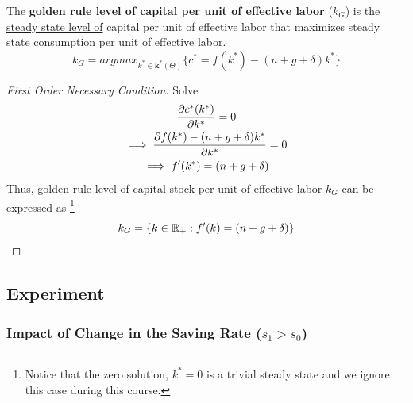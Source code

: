 \documentclass[]{article}
\begin{document}
		\begin{definition}
			The \textbf{golden rule level of capital per unit of effective labor} ($k_G$) is the \ul{steady state level of} capital per unit of effective labor that maximizes steady state consumption per unit of effective labor.
				\[
					k_G = argmax_{k^* \in \textbf{k}^*(\Theta)} \{c^* = f(k^*) - (n+g+ \delta) k^*\}
				\]
		\end{definition}
		
		\begin{proof}[First Order Necessary Condition]
		Solve \\
			\begin{gather*}
				\frac{\partial{c^*(k^*)}}{\partial{k^*}} = 0 \\
				\implies \frac{\partial{f(k^*) - (n+g+\delta)k^*}}{\partial{k^*}} = 0 \\
				\implies f'(k^*) = (n+g+\delta)
			\end{gather*}
			Thus, golden rule level of capital stock per unit of effective labor $k_G$ can be expressed as \footnote{Notice that the zero solution, $k^* = 0$ is a trivial steady state and we ignore this case during this course.}
			\begin{equation}
				k_G = \{k \in \mathbb{R}_{+}: f'(k) = (n+g+\delta)\}
			\end{equation}
		\end{proof}
		
		\subsection{Experiment}
			\subsubsection{Impact of Change in the Saving Rate ($s_1 > s_0$)}
\end{document}
